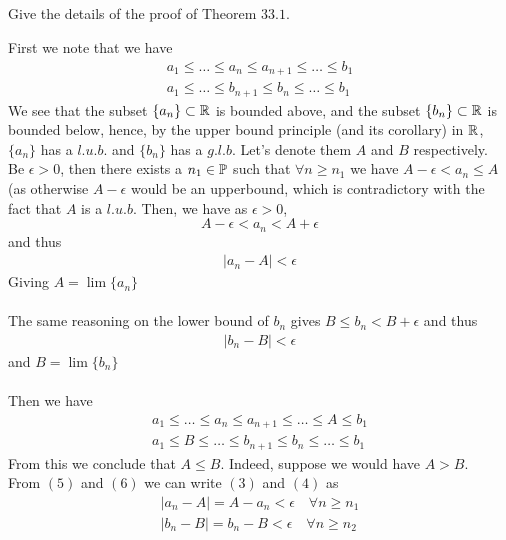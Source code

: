 \subsection{}
\begin{tcolorbox}
Give the details of the proof of Theorem $\mathbf{33.1}$.
\end{tcolorbox}
First we note that we have 
\begin{align}
a_1\leq \dots \leq a_n\leq a_{n+1}\leq\dots \leq b_1\\
a_1\leq \dots \leq b_{n+1}\leq b_n \leq\dots \leq b_1
\end{align}
We see that the subset $\{a_n\}\subset\mathbb{R} $ is bounded above, and the subset $\{b_n\}\subset\mathbb{R} $ is bounded below, hence, by the upper bound principle (and its corollary) in $\mathbb{R}$, $\{a_n\}$ has a $l.u.b.$ and  $\{b_n\}$ has a $g.l.b.$ Let's denote them $A$ and $B$ respectively.\\
Be $\epsilon>0$, then there exists a $n_1\in\mathbb{P}$ such that  $\forall n\geq n_1 $ we have $A-\epsilon < a_n\leq A$ (as otherwise $A-\epsilon$ would be an upperbound, which is contradictory with the fact that $A$ is a $l.u.b.$
Then, we have as $\epsilon>0$, 
$$A-\epsilon < a_n< A+\epsilon$$ and thus 
\begin{align}|a_n-A|<\epsilon\end{align}
Giving $A=\lim \{a_n\}$\\\\
The same reasoning on the lower bound of $b_n$ gives $B\leq b_n < B+\epsilon$ and thus 
\begin{align}|b_n-B|<\epsilon\end{align}
and $B=\lim \{b_n\}$\\\\
Then we have 
\begin{align}
a_1\leq \dots \leq a_n\leq a_{n+1}\leq\dots \leq A\leq b_1\\
a_1\leq B \leq \dots \leq b_{n+1}\leq b_n \leq\dots \leq b_1
\end{align}
From this we conclude that $A\leq B$. Indeed, suppose we would have $A>B$.\\
From $(5)$ and $(6)$ we can write $(3)$ and $(4)$ as 
\begin{align}
|a_n-A|= A-a_n<\epsilon\quad \forall n\geq n_1\\
|b_n-B|= b_n-B<\epsilon\quad \forall n\geq n_2
\end{align}
